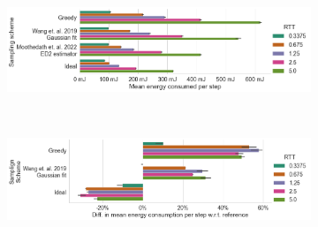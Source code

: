\begin{figure}
    \centering
    \begin{subfigure}[t]{\textwidth}
        \centering
        \includegraphics[width=.9\textwidth]{figs/new_model/sampling_energy.png}
        \caption{}
    \end{subfigure}\\
    \medskip
    \begin{subfigure}[t]{\textwidth}
        \centering
        \includegraphics[width=.9\textwidth]{figs/new_model/sampling_energy_diff.png}
        \caption{}
    \end{subfigure}
\end{figure}

